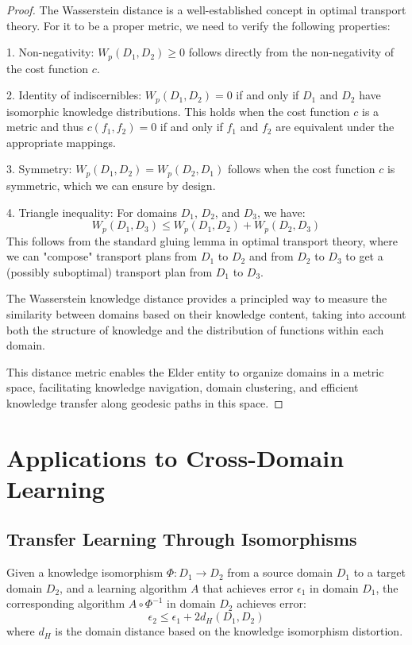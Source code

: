 \begin{proof}
The Wasserstein distance is a well-established concept in optimal transport theory. For it to be a proper metric, we need to verify the following properties:

1. Non-negativity: $W_p(D_1, D_2) \geq 0$ follows directly from the non-negativity of the cost function $c$.

2. Identity of indiscernibles: $W_p(D_1, D_2) = 0$ if and only if $D_1$ and $D_2$ have isomorphic knowledge distributions. This holds when the cost function $c$ is a metric and thus $c(f_1, f_2) = 0$ if and only if $f_1$ and $f_2$ are equivalent under the appropriate mappings.

3. Symmetry: $W_p(D_1, D_2) = W_p(D_2, D_1)$ follows when the cost function $c$ is symmetric, which we can ensure by design.

4. Triangle inequality: For domains $D_1$, $D_2$, and $D_3$, we have:
\begin{equation}
W_p(D_1, D_3) \leq W_p(D_1, D_2) + W_p(D_2, D_3)
\end{equation}
This follows from the standard gluing lemma in optimal transport theory, where we can "compose" transport plans from $D_1$ to $D_2$ and from $D_2$ to $D_3$ to get a (possibly suboptimal) transport plan from $D_1$ to $D_3$.

The Wasserstein knowledge distance provides a principled way to measure the similarity between domains based on their knowledge content, taking into account both the structure of knowledge and the distribution of functions within each domain.

This distance metric enables the Elder entity to organize domains in a metric space, facilitating knowledge navigation, domain clustering, and efficient knowledge transfer along geodesic paths in this space.
\end{proof}

\section{Applications to Cross-Domain Learning}

\subsection{Transfer Learning Through Isomorphisms}

\begin{theorem}
Given a knowledge isomorphism $\Phi: D_1 \to D_2$ from a source domain $D_1$ to a target domain $D_2$, and a learning algorithm $A$ that achieves error $\epsilon_1$ in domain $D_1$, the corresponding algorithm $A \circ \Phi^{-1}$ in domain $D_2$ achieves error:
\begin{equation}
\epsilon_2 \leq \epsilon_1 + 2d_H(D_1, D_2)
\end{equation}
where $d_H$ is the domain distance based on the knowledge isomorphism distortion.
\end{theorem}

